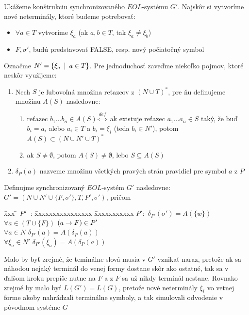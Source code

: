 \begin{dokaz}
Ukážeme konštrukciu synchronizovaného $EOL$-systému $G'$. Najskôr
si vytvoríme nové neterminály, ktoré budeme potrebovať:
\begin{itemize}
\item $\forall a\in T$ vytvoríme $\xi_a$ (ak $a,b\in T$, tak
$\xi_a\neq\xi_b$)
\item $F,\sigma'$, budú predstavovať FALSE, resp. nový počiatočný
symbol
\end{itemize}
Označme $N'=\{\xi_a\enspace |\enspace a\in T\}$. Pre jednoduchosť zaveďme
niekoľko pojmov, ktoré neskôr využijeme:
\begin{enumerate}
\item Nech $S$ je ľubovoľná množina reťazcov z $(N\cup T)^*$, pre
ňu definujeme množinu $A(S)$ nasledovne:
\begin{enumerate}
\item reťazec $b_{1}\dots b_{n}\in A(S)\overset{def}
\Longleftrightarrow$ ak existuje reťazec $a_{1}\dots a_{n}\in S$
taký, že buď $b_i=a_i$ alebo $a_i\in T$ a $b_i=\xi_i$ (teda
$b_i\in N'$), potom $A(S)\subset(N\cup N'\cup T)^*$
\item ak $S\neq\emptyset$, potom $A(S)\neq\emptyset$, lebo
$S\subseteq A(S)$
\end{enumerate}
\item $\delta_P(a)$ nazveme množinu všetkých pravých strán
pravidiel pre symbol $a$ z $P$
\end{enumerate}
Definujme synchronizovaný $EOL$-systém $G'$ nasledovne: $G'=(N\cup
N'\cup\{F,\sigma'\},T,P',\sigma')$, pričom
\begin{tabbing}
\= xxx \= $P'\enspace$: \= xxxxxxxxxxxxxxxx \= xxxxxxxxxxx \kill \>\>
$P':$ \> $\delta_{P'}(\sigma')=A(\{w\})$\\ \>\>\> $\forall
a\in(T\cup \{F\})$ \> $(a\rightarrow F)\in P'$\\ \>\>\> $\forall a\in N$
\> $\delta_{P'}(a)=A(\delta_P(a))$\\ \>\>\> $\forall\xi_a\in N'$
\> $\delta_{P'}(\xi_a)=A(\delta_P(a))$
\end{tabbing}
Malo by byť zrejmé, že teminálne slová musia v $G'$ vznikať naraz,
pretože ak sa náhodou nejaký terminál do venej formy dostane skôr
ako ostatné, tak sa v ďaľšom kroku prepíše nutne na $F$ a z $F$ sa
už nikdy terminál nestane. Rovnako zrejmé by malo byť
$L(G')=L(G)$, pretože nové neterminály $\xi_i$ vo vetnej forme
akoby nahrádzali terminálne symboly, a tak simulovali odvodenie v
pôvodnom systéme $G$
\end{dokaz}

